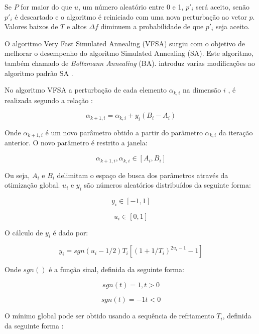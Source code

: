 Se $P$ for maior do que $u$, um número aleatório entre 0 e 1, $p'_i$ será aceito, senão $p'_i$ é
descartado e o algoritmo é reiniciado com uma nova perturbação ao vetor $p$.
Valores baixos de $T$ e altos $\Delta f$ diminuem a probabilidade de que $p'_i$ seja aceito.

O algoritmo Very
Fast Simulated Annealing (VFSA) surgiu com o objetivo de melhorar o desempenho do algoritmo Simulated Annealing (SA). 
Este algoritmo, também chamado de \textit{Boltzmann Annealing} (BA).
introduz varias modificações ao
algoritmo padrão SA \cite{ingber}.

No algoritmo VFSA a perturbação de cada elemento $\alpha_{k,i}$ na dimensão $i$ , é realizada
segundo a relação \cite{klaus}:

\begin{equation}
\label{eq:2.11}
 \alpha_{k+1,i}=\alpha_{k,i}+y_i(B_i-A_i)
\end{equation}

Onde $\alpha_{k+1,i}$ é um novo parâmetro obtido a partir do parâmetro $\alpha_{k,i}$ da iteração anterior.
O novo parâmetro é restrito a janela:

\begin{equation}
\label{eq:2.12}
  \alpha_{k+1,i},\alpha_{k,i}\in[A_i,B_i]
\end{equation}

Ou seja, $A_i$ e $B_i$ delimitam o espaço de busca dos parâmetros através da otimização global. 
$u_i$ e $y_i$ são números aleatórios distribuídos da seguinte forma:

\begin{equation}
\label{eq:2.13}
  y_i\in[-1,1]
\end{equation}

\begin{equation}
\label{eq:2.14}
  u_i\in[0,1]
\end{equation}

O cálculo de $y_i$ é dado por:

\begin{equation}
\label{eq:2.15}
  y_i=sgn(u_i-1/2)T_i[(1+1/T_i)^{2u_i-1}-1]
\end{equation}

Onde $sgn()$ é a função sinal, definida da seguinte forma:

$$sgn(t)=1, t > 0$$

$$sgn(t)=-1 t < 0$$


O mínimo global pode ser obtido usando a sequência de refriamento $T_i$, definida da seguinte forma \cite{ingber}:

